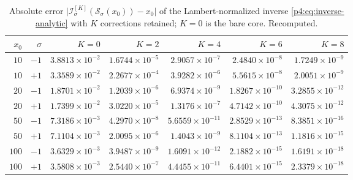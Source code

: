 \documentclass[11pt,a4paper,oneside]{book}
\theoremstyle{plain}
\theoremstyle{definition}
\theoremstyle{remark}
\begin{document}
\begin{table}[htbp]
\centering
\caption{Absolute error
$\bigl|\mathcal I^{[K]}_\sigma(\mathcal S_\sigma(x_0))-x_0\bigr|$ of the
Lambert-normalized inverse \cref{p4:eq:inverse-analytic} with $K$ corrections
retained; $K=0$ is the bare core.  Recomputed.}
\label{p4:tab:inverse-errors}
\small
\begin{tabular}{@{}rrrrrrr@{}}
\toprule
$x_0$&$\sigma$&$K=0$&$K=2$&$K=4$&$K=6$&$K=8$\\
\midrule
$10$&$-1$&$3.8813\!\times\!10^{-2}$&$1.6744\!\times\!10^{-5}$&$2.9057\!\times\!10^{-7}$&$2.4840\!\times\!10^{-8}$&$1.7249\!\times\!10^{-9}$\\
$10$&$+1$&$3.3589\!\times\!10^{-2}$&$2.2677\!\times\!10^{-4}$&$3.9282\!\times\!10^{-6}$&$5.5615\!\times\!10^{-8}$&$2.0051\!\times\!10^{-9}$\\
$20$&$-1$&$1.8701\!\times\!10^{-2}$&$1.2039\!\times\!10^{-6}$&$6.9374\!\times\!10^{-9}$&$1.8267\!\times\!10^{-10}$&$3.2855\!\times\!10^{-12}$\\
$20$&$+1$&$1.7399\!\times\!10^{-2}$&$3.0220\!\times\!10^{-5}$&$1.3176\!\times\!10^{-7}$&$4.7142\!\times\!10^{-10}$&$4.3075\!\times\!10^{-12}$\\
$50$&$-1$&$7.3186\!\times\!10^{-3}$&$4.2970\!\times\!10^{-8}$&$5.6559\!\times\!10^{-11}$&$2.8529\!\times\!10^{-13}$&$8.3851\!\times\!10^{-16}$\\
$50$&$+1$&$7.1104\!\times\!10^{-3}$&$2.0095\!\times\!10^{-6}$&$1.4043\!\times\!10^{-9}$&$8.1104\!\times\!10^{-13}$&$1.1816\!\times\!10^{-15}$\\
$100$&$-1$&$3.6329\!\times\!10^{-3}$&$3.9487\!\times\!10^{-9}$&$1.6091\!\times\!10^{-12}$&$2.1882\!\times\!10^{-15}$&$1.6191\!\times\!10^{-18}$\\
$100$&$+1$&$3.5808\!\times\!10^{-3}$&$2.5440\!\times\!10^{-7}$&$4.4455\!\times\!10^{-11}$&$6.4401\!\times\!10^{-15}$&$2.3379\!\times\!10^{-18}$\\
\bottomrule
\end{tabular}
\end{table}
\end{document}
